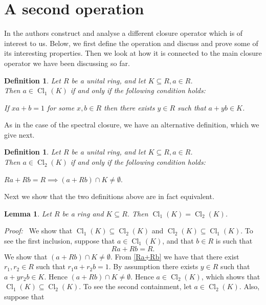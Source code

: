 \documentclass[12pt, oneside]{book}
\newtheorem{lemma}[theorem]{Lemma}
\newtheorem{definition}[theorem]{Definition}
\newcommand{\proof}{{\noindent \it Proof:~}}
\def\Cl{\operatorname{Cl}}
\begin{document}
\section{A second operation}
In \cite{APP1, APP2} the authors construct and analyse a different closure operator which is 
of interest to us. Below, we first define the operation and discuss and prove some of its interesting properties. Then we look at how it is connected to the main closure operator we have been discussing so far.
\begin{definition} \label{def1}
\normalfont
Let $R$ be a unital ring, and let $K \subseteq R, a \in R$. \\
Then $a \in \Cl_1(K)$ if and only if the following condition holds:
\begin{center}
If $xa + b = 1$ for some $x, b \in R$ then there exists $y \in R$ such that 
$a + yb \in K$.
\end{center}
\end{definition}
\noindent As in the case of the spectral closure, we have an alternative definition, 
which we give next.
\begin{definition}\label{def2}
\normalfont Let $R$ be a unital ring, and let $K \subseteq R, a \in R$. \\
Then $a \in \Cl_2(K)$
if and only if the following condition holds:
\begin{center}
$Ra + Rb = R \implies (a + Rb) \cap K \neq \emptyset.$
\end{center}
\end{definition}
\noindent Next we show that the two definitions above are in fact equivalent. 
\begin{lemma} \label{Equivalent}
\normalfont
Let $R$ be a ring and $K \subseteq R$. Then $\Cl_1(K) = \Cl_2(K)$.
\end{lemma}
\proof \space
\noindent We show that $\Cl_1(K) \subseteq \Cl_2(K)$ 
and $\Cl_2(K) \subseteq \Cl_1(K)$.
\vskip 0.3cm
\noindent To see the first inclusion, suppose that $a \in \Cl_1(K)$, and that $b \in R$ 
is such that 
\begin{equation} \label{Ra+Rb}
Ra + Rb = R. 
\end{equation}
\noindent We show that $(a + Rb) \cap K \neq \emptyset.$ From \eqref{Ra+Rb} we have that 
there exist $r_1, r_2 \in R$ such that $r_1a + r_2b = 1$. By assumption there exists 
$y \in R$ such that $a + yr_2b \in K.$ Hence $(a + Rb) \cap K \neq \emptyset.$ 
Hence $a \in \Cl_2(K)$, which shows that $\Cl_1(K) \subseteq \Cl_2(K)$.
\vskip 0.3cm
\noindent To see the second containment, let $a \in \Cl_2(K)$. Also, suppose that 
\end{document}

